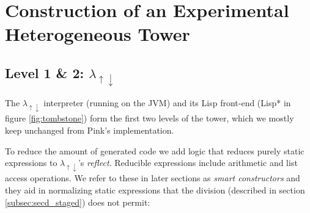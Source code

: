 \documentclass[a4paper,12pt,twoside,openright]{report}
\theoremstyle{definition}
\newcommand{\mslang}{$\lambda_{\uparrow\downarrow}$}
\begin{document}





\newpage
\section{Construction of an Experimental Heterogeneous Tower}\label{sec:tower}
\subsection{Level 1 \& 2: \texorpdfstring{\mslang}{Lg}}\label{sec:mslang}

The \mslang{} interpreter (running on the JVM) and its Lisp front-end (Lisp* in figure \ref{fig:tombstone}) form the first two levels of the tower, which we mostly keep unchanged from Pink's implementation.

To reduce the amount of generated code we add logic that reduces purely static expressions to \mslang's \textit{reflect}. Reducible expressions include arithmetic and list access operations. We refer to these in later sections as \textit{smart constructors} and they aid in normalizing static expressions that the division (described in section \ref{subsec:secd_staged}) does not permit:
\end{document}

